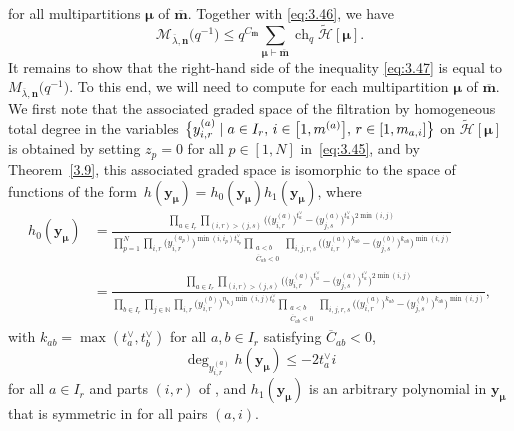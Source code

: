 \documentclass[pdftex]{sigma}
\numberwithin{equation}{section}
\DeclareMathOperator{\ch}{ch}
\begin{document}
\smash{$
\ch_q\tilde{ \Gamma}_{\bm{\mu}}/\tilde{\Gamma}_{\bm{\mu}}'
\leq\ch_q\tilde{\mathcal{H}}[\bm{\mu}]
$}
for all multipartitions $\bm{\mu}$ of $\overline{\mathbf{m}}$. Together with \eqref{eq:3.46}, we have
\begin{equation}\label{eq:3.47}
\mathcal{M}_{\overline{\lambda},\mathbf{n}}\bigl(q^{-1}\bigr)
\leq q^{C_{\overline{\mathbf{m}}}}\sum_{\bm{\mu}\vdash \overline{\mathbf{m}}}\ch_q\tilde{\mathcal{H}}[\bm{\mu}].
\end{equation}
It remains to show that the right-hand side of the inequality \eqref{eq:3.47} is equal to $M_{\overline{\lambda},\mathbf{n}}\bigl(q^{-1}\bigr)$. To this end, we will need to compute \smash{$\ch_q\tilde{ \mathcal{H}}[\bm{\mu}]$} for each multipartition $\bm{\mu}$ of $\overline{\mathbf{m}}$. We first note that the associated graded space of the filtration by homogeneous total degree in the variables $\smash{\bigl\{y_{i,r}^{(a)}}\mid a\in I_r,\, i\in\smash{\bigl[1,m^{(a)}\bigr]},\, r\in [1, m_{a,i}]\bigr\}$ on $\tilde{\mathcal{H}}[\bm{\mu}]$ is obtained by setting $z_p=0$ for all $p\in[1,N]$ in~\eqref{eq:3.45}, and by Theorem~\ref{3.9}, this associated graded space is isomorphic to the space of functions of the form~${
h(\mathbf{y}_{\bm{\mu}})
=h_0(\mathbf{y}_{\bm{\mu}})h_1(\mathbf{y}_{\bm{\mu}})}$,
where
\begin{align*}
 h_0(\mathbf{y}_{\bm{\mu}})
&=\frac{\prod_{a\in I_r}\prod_{(i,r)>(j,s)}\bigl(\bigl(y_{i,r}^{(a)}\bigr)^{t_a^{\vee}}-\bigl(y_{j,s}^{(a)}\bigr)^{t_a^{\vee}}) ^{2\min(i,j)}}{\prod_{p=1}^N\prod_{i,r}\bigl(y_{i,r} ^{(a_p)}\bigr)^{\min(i,i_p)t_{a_p}^{\vee}} \prod_{\substack{a<b\\ \overline{C}_{ab}<0}}\prod_{i,j,r,s}\bigl(\bigl(y_{i,r}^{(a)}\bigr)^{k_{ab}}-\bigl(y_{j,s}^{(b)}\bigr) ^{k_{ab}}\bigr)^{\min(i,j)}}\\
&=\frac{\prod_{a\in I_r}\prod_{(i,r)>(j,s)}\bigl(\bigl(y_{i,r}^{(a)}\bigr)^{t_a^{\vee}}-\bigl(y_{j,s}^{(a)}\bigr)^{t_a^{\vee}}\bigr) ^{2\min(i,j)}}{\prod_{b\in I_r}\prod_{j\in \mathbb{N}}\prod_{i,r}\bigl(y_{i,r}^{(b)}\bigr)^{n_{b,j}\min(i,j) t_b^{\vee}}\prod_{\substack{a<b\\ \overline{C}_{ab}<0}} \prod_{i,j,r,s}\bigl(\bigl(y_{i,r}^{(a)}\bigr)^{k_{ab}}-\bigl(y_{j,s}^{(b)}\bigr) ^{k_{ab}}\bigr)^{\min(i,j)}},
\end{align*}
with $k_{ab}=\max(t_a^{\vee},t_b^{\vee})$ for all $a,b\in I_r$ satisfying $\overline{C}_{ab}<0$,
\begin{equation}\label{eq:3.49}
\deg_{y_{i,r}^{(a)}}h(\mathbf{y}_{\bm{\mu}})
\leq-2t_a^{\vee}i
\end{equation}
for all $a\in I_r$ and parts $(i,r)$ of , and $h_1(\mathbf{y}_{\bm{\mu}})$ is an arbitrary polynomial in $\mathbf{y}_{\bm{\mu}}$ that is symmetric in  for all pairs $(a,i)$.
\end{document}
